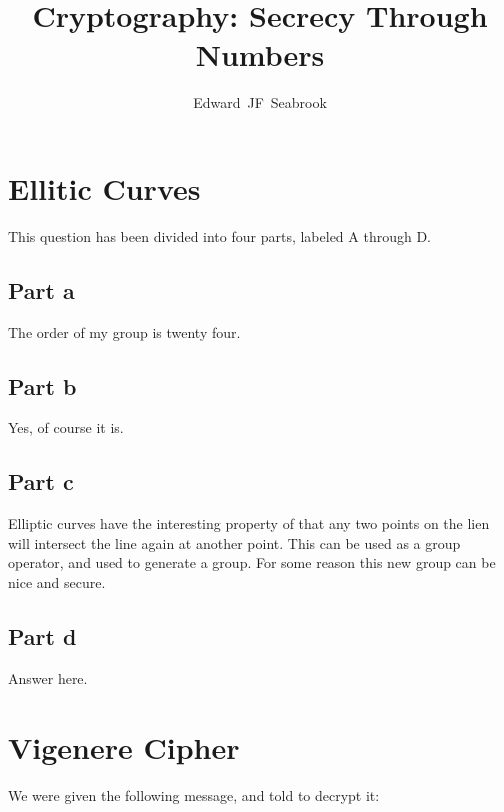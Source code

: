\documentclass[12pt,a4paper,twoside]{article}
\begin{document}
\title{Cryptography: Secrecy Through Numbers}
\author{Edward~JF~Seabrook}

\maketitle

\section{Ellitic Curves}
This question has been divided into four parts, labeled A through D.

\subsection{Part a}
The order of my group is twenty four. 

\subsection{Part b}
Yes, of course it is. 

\subsection{Part c}
Elliptic curves have the interesting property of that any two points on the
lien will intersect the line again at another point. This can be used as a
group operator, and used to generate a group. For some reason this new group
can be nice and secure.  

\subsection{Part d}
Answer here. 


\section{Vigenere Cipher}
We were given the following message, and told to decrypt it:
\end{document}
